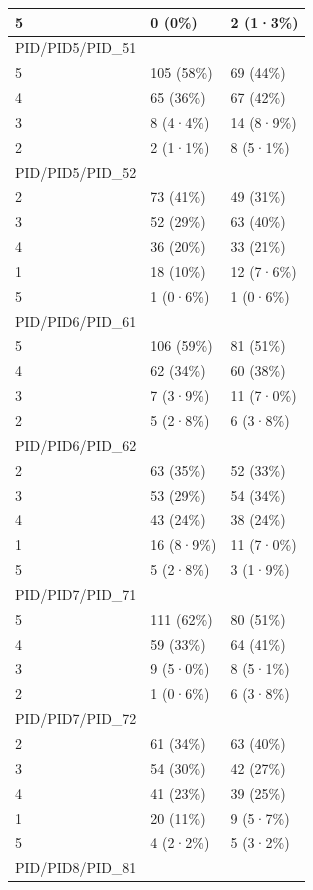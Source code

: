 \documentclass[
]{book}
\begin{document}
\begin{tabular}{l|l|l}
\hline
5 & 0 (0\%) & 2 (1·3\%)\\
\hline
PID/PID5/PID\_51 &  & \\
\hline
5 & 105 (58\%) & 69 (44\%)\\
\hline
4 & 65 (36\%) & 67 (42\%)\\
\hline
3 & 8 (4·4\%) & 14 (8·9\%)\\
\hline
2 & 2 (1·1\%) & 8 (5·1\%)\\
\hline
PID/PID5/PID\_52 &  & \\
\hline
2 & 73 (41\%) & 49 (31\%)\\
\hline
3 & 52 (29\%) & 63 (40\%)\\
\hline
4 & 36 (20\%) & 33 (21\%)\\
\hline
1 & 18 (10\%) & 12 (7·6\%)\\
\hline
5 & 1 (0·6\%) & 1 (0·6\%)\\
\hline
PID/PID6/PID\_61 &  & \\
\hline
5 & 106 (59\%) & 81 (51\%)\\
\hline
4 & 62 (34\%) & 60 (38\%)\\
\hline
3 & 7 (3·9\%) & 11 (7·0\%)\\
\hline
2 & 5 (2·8\%) & 6 (3·8\%)\\
\hline
PID/PID6/PID\_62 &  & \\
\hline
2 & 63 (35\%) & 52 (33\%)\\
\hline
3 & 53 (29\%) & 54 (34\%)\\
\hline
4 & 43 (24\%) & 38 (24\%)\\
\hline
1 & 16 (8·9\%) & 11 (7·0\%)\\
\hline
5 & 5 (2·8\%) & 3 (1·9\%)\\
\hline
PID/PID7/PID\_71 &  & \\
\hline
5 & 111 (62\%) & 80 (51\%)\\
\hline
4 & 59 (33\%) & 64 (41\%)\\
\hline
3 & 9 (5·0\%) & 8 (5·1\%)\\
\hline
2 & 1 (0·6\%) & 6 (3·8\%)\\
\hline
PID/PID7/PID\_72 &  & \\
\hline
2 & 61 (34\%) & 63 (40\%)\\
\hline
3 & 54 (30\%) & 42 (27\%)\\
\hline
4 & 41 (23\%) & 39 (25\%)\\
\hline
1 & 20 (11\%) & 9 (5·7\%)\\
\hline
5 & 4 (2·2\%) & 5 (3·2\%)\\
\hline
PID/PID8/PID\_81 &  & \\

\end{tabular}
\end{document}
